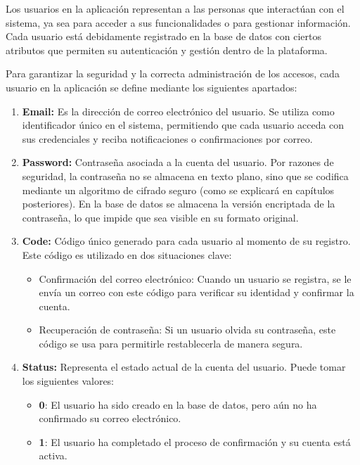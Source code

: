 \documentclass[draft]{scrbook}
\begin{document}
Los usuarios en la aplicación representan a las personas que interactúan con el sistema, ya sea para acceder a sus funcionalidades o para gestionar información. Cada usuario está debidamente registrado en la base de datos con ciertos atributos que permiten su autenticación y gestión dentro de la plataforma. 

Para garantizar la seguridad y la correcta administración de los accesos, cada usuario en la aplicación se define mediante los siguientes apartados:

\begin{enumerate}
    \item \textbf{Email:}  
    Es la dirección de correo electrónico del usuario. Se utiliza como identificador único en el sistema, permitiendo que cada usuario acceda con sus credenciales y reciba notificaciones o confirmaciones por correo.

    \item \textbf{Password:}  
    Contraseña asociada a la cuenta del usuario. Por razones de seguridad, la contraseña no se almacena en texto plano, sino que se codifica mediante un algoritmo de cifrado seguro (como se explicará en capítulos posteriores). En la base de datos se almacena la versión encriptada de la contraseña, lo que impide que sea visible en su formato original.

    \item \textbf{Code:}  
    Código único generado para cada usuario al momento de su registro. Este código es utilizado en dos situaciones clave:
    \begin{itemize}
        \item Confirmación del correo electrónico: Cuando un usuario se registra, se le envía un correo con este código para verificar su identidad y confirmar la cuenta.
        \item Recuperación de contraseña: Si un usuario olvida su contraseña, este código se usa para permitirle restablecerla de manera segura.
    \end{itemize}
    
    \item \textbf{Status:}  
    Representa el estado actual de la cuenta del usuario. Puede tomar los siguientes valores:
    \begin{itemize}
        \item \textbf{0}: El usuario ha sido creado en la base de datos, pero aún no ha confirmado su correo electrónico.
        \item \textbf{1}: El usuario ha completado el proceso de confirmación y su cuenta está activa.
    \end{itemize}
    

\end{enumerate}
\end{document}
